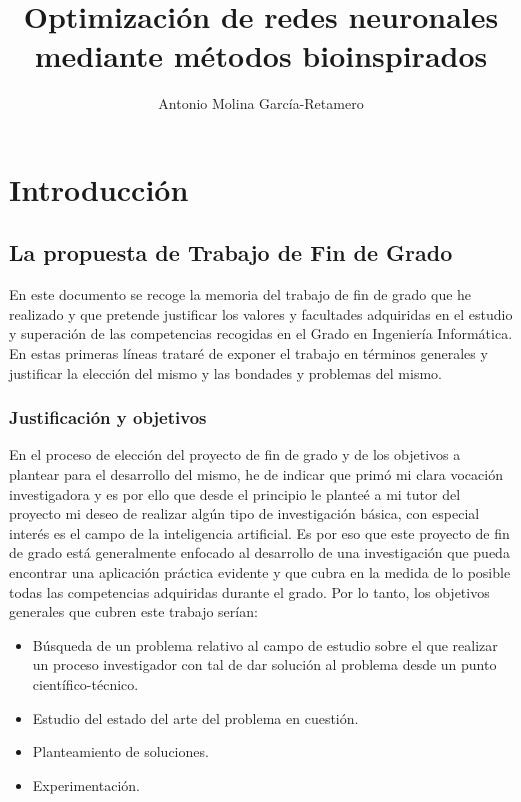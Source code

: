 \documentclass[10pt,a4paper, twocolumn]{report}
\author{Antonio Molina García-Retamero}
\title{Optimización de redes neuronales mediante métodos bioinspirados}
\begin{document}
\onecolumn
\maketitle
\pagebreak
\tableofcontents
\pagebreak

\chapter{Introducción}
\section{La propuesta de Trabajo de Fin de Grado}
En este documento se recoge la memoria del trabajo de fin de grado que he realizado y que pretende justificar los valores y facultades adquiridas en el estudio y superación de las competencias recogidas en el Grado en Ingeniería Informática. En estas primeras líneas trataré de exponer el trabajo en términos generales y justificar la elección del mismo y las bondades y problemas del mismo.

\subsection{Justificación y objetivos}
En el proceso de elección del proyecto de fin de grado y de los objetivos a plantear para el desarrollo del mismo, he de indicar que primó mi clara vocación investigadora y es por ello que desde el principio le planteé a mi tutor del proyecto mi deseo de realizar algún tipo de investigación básica, con especial interés es el campo de la inteligencia artificial. Es por eso que este proyecto de fin de grado está generalmente enfocado al desarrollo de una investigación que pueda encontrar una aplicación práctica evidente y que cubra en la medida de lo posible todas las competencias adquiridas durante el grado. Por lo tanto, los objetivos generales que cubren este trabajo serían:
\begin{itemize}
	\item Búsqueda de un problema relativo al campo de estudio sobre el que realizar un proceso investigador con tal de dar solución al problema desde un punto científico-técnico.
	\item Estudio del estado del arte del problema en cuestión.
	\item Planteamiento de soluciones.
	\item Experimentación.
\end{itemize}

\end{document}
